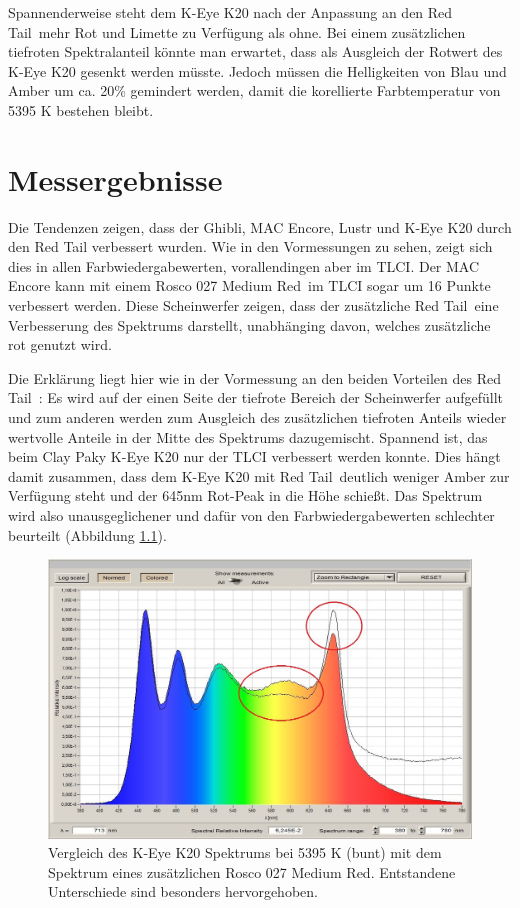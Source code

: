 Spannenderweise steht dem K-Eye K20 nach der Anpassung an den \glqq Red Tail\grqq\ mehr Rot und Limette zu Verfügung als ohne. Bei einem zusätzlichen tiefroten Spektralanteil könnte man erwartet, dass als Ausgleich der Rotwert des K-Eye K20 gesenkt werden müsste. Jedoch müssen die Helligkeiten von Blau und Amber um ca. 20\% gemindert werden, damit die korellierte Farbtemperatur von 5395 K bestehen bleibt.
 

\chapter{Messergebnisse}

Die Tendenzen zeigen, dass der Ghibli, MAC Encore, Lustr und K-Eye K20 durch den Red Tail verbessert wurden. Wie in den Vormessungen zu sehen, zeigt sich dies in allen Farbwiedergabewerten, vorallendingen aber im TLCI. Der MAC Encore kann mit einem Rosco 027 \glqq Medium Red\grqq\ im TLCI sogar um 16 Punkte verbessert werden. Diese Scheinwerfer zeigen, dass der zusätzliche \glqq Red Tail\grqq\ eine Verbesserung des Spektrums darstellt, unabhänging davon, welches zusätzliche rot genutzt wird. 

Die Erklärung liegt hier wie in der Vormessung an den beiden Vorteilen des \glqq Red Tail\grqq\ : Es wird auf der einen Seite der tiefrote Bereich der Scheinwerfer aufgefüllt und zum anderen werden zum Ausgleich des zusätzlichen tiefroten Anteils wieder wertvolle Anteile in der Mitte des Spektrums dazugemischt. Spannend ist, das beim Clay Paky K-Eye K20 nur der TLCI verbessert werden konnte. Dies hängt damit zusammen, dass dem K-Eye K20 mit \glqq Red Tail\grqq\ deutlich weniger Amber zur Verfügung steht und der 645nm Rot-Peak in die Höhe schießt. Das Spektrum wird also unausgeglichener und dafür von den Farbwiedergabewerten schlechter beurteilt (Abbildung \ref{b_keye1}).
\begin{figure}[H]     %
\centering
\includegraphics[width=1.0\textwidth]{bilder/keye1} 
\caption {Vergleich des K-Eye K20 Spektrums bei 5395 K (bunt) mit dem Spektrum eines zusätzlichen Rosco 027 \glqq Medium Red\grqq . Entstandene Unterschiede sind besonders hervorgehoben.}\label{b_keye1}
\end{figure}

